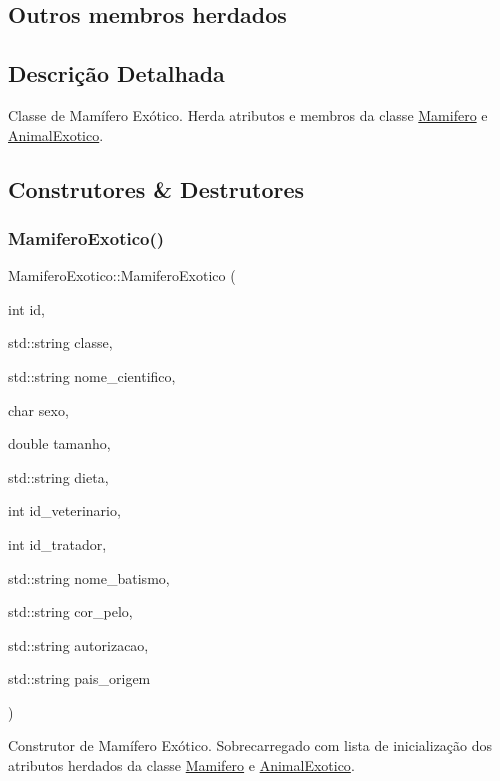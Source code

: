 \subsection*{Outros membros herdados}


\subsection{Descrição Detalhada}
Classe de Mamífero Exótico. Herda atributos e membros da classe \hyperlink{classMamifero}{Mamifero} e \hyperlink{classAnimalExotico}{Animal\+Exotico}. 

\subsection{Construtores \& Destrutores}
\mbox{\label{classMamiferoExotico_a8ab63742e80684479f0b573a012f6d27}} 
\subsubsection{\texorpdfstring{Mamifero\+Exotico()}{MamiferoExotico()}}
{\footnotesize\ttfamily Mamifero\+Exotico\+::\+Mamifero\+Exotico (\begin{DoxyParamCaption}\item[{int}]{id,  }\item[{std\+::string}]{classe,  }\item[{std\+::string}]{nome\+\_\+cientifico,  }\item[{char}]{sexo,  }\item[{double}]{tamanho,  }\item[{std\+::string}]{dieta,  }\item[{int}]{id\+\_\+veterinario,  }\item[{int}]{id\+\_\+tratador,  }\item[{std\+::string}]{nome\+\_\+batismo,  }\item[{std\+::string}]{cor\+\_\+pelo,  }\item[{std\+::string}]{autorizacao,  }\item[{std\+::string}]{pais\+\_\+origem }\end{DoxyParamCaption})}

Construtor de Mamífero Exótico. Sobrecarregado com lista de inicialização dos atributos herdados da classe \hyperlink{classMamifero}{Mamifero} e \hyperlink{classAnimalExotico}{Animal\+Exotico}. \mbox{\label{classMamiferoExotico_a2ab6c04adde874cc40aa55b5f586c15a}} 
